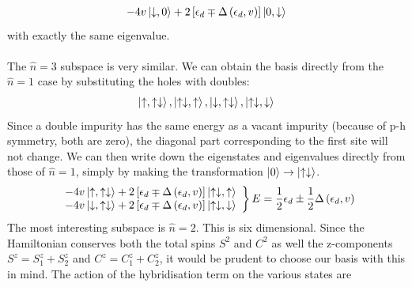 \documentclass[twoside]{report}
\numberwithin{equation}{section}
\begin{document}
\begin{equation}\begin{aligned}
	-4v\ket{\downarrow,0} + 2 \left[ \epsilon_d \mp \Delta\left(\epsilon_d , v \right)\right] \ket{0, \downarrow}
\end{aligned}\end{equation}
with exactly the same eigenvalue.
\\\\The \(\hat n = 3\) subspace is very similar. We can obtain the basis directly from the \(\hat n = 1\) case by substituting the holes with doubles:
\begin{equation}\begin{aligned}
	\ket{\uparrow,\uparrow \downarrow}, \ket{\uparrow \downarrow,\uparrow}, \ket{\downarrow,\uparrow \downarrow}, \ket{\uparrow \downarrow,\downarrow}
\end{aligned}\end{equation}
Since a double impurity has the same energy as a vacant impurity (because of p-h symmetry, both are zero), the diagonal part corresponding to the first site will not change. We can then write down the eigenstates and eigenvalues directly from those of \(\hat n=1\), simply by making the transformation \(\ket{0} \to \ket{ \uparrow \downarrow}\).
\begin{align}
	\left.
	\begin{array}{l}
	-4v \ket{\uparrow,\uparrow \downarrow} +  2\left[ \epsilon_d \mp \Delta\left(\epsilon_d , v\right)  \right] \ket{\uparrow \downarrow, \uparrow}\\
	-4v \ket{\downarrow,\uparrow \downarrow} + 2 \left[ \epsilon_d \mp \Delta\left(\epsilon_d, v\right)  \right] \ket{\uparrow \downarrow, \downarrow}\end{array}
	\right\}
	E = \frac{1}{2} \epsilon_d \pm \frac{1}{2}\Delta\left(\epsilon_d , v \right)
\end{align}
The most interesting subspace is \(\hat n=2\). This is six dimensional. Since the Hamiltonian conserves both the total spins \(S^2\) and \(C^2\) as well the z-components \(S^z = S_1^z + S^z_2\) and \(C^z = C_1^z + C^z_2\), it would be prudent to choose our basis with this in mind. The action of the hybridisation term on the various states are
\end{document}
